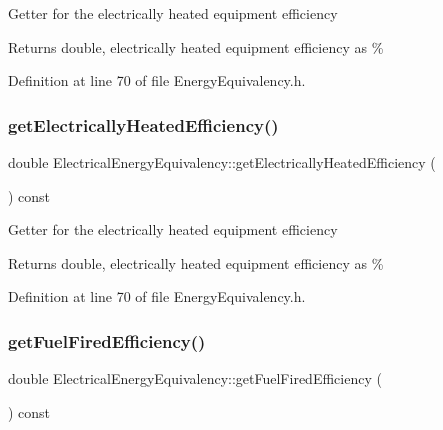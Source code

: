 Getter for the electrically heated equipment efficiency

\begin{DoxyReturn}{Returns}
double, electrically heated equipment efficiency as \% 
\end{DoxyReturn}


Definition at line 70 of file Energy\+Equivalency.\+h.

\mbox{\label{class_electrical_energy_equivalency_a83438510f522aa045f4b1007fca1d2fd}} 
\subsubsection{\texorpdfstring{get\+Electrically\+Heated\+Efficiency()}{getElectricallyHeatedEfficiency()}\hspace{0.1cm}{\footnotesize\ttfamily [3/3]}}
{\footnotesize\ttfamily double Electrical\+Energy\+Equivalency\+::get\+Electrically\+Heated\+Efficiency (\begin{DoxyParamCaption}{ }\end{DoxyParamCaption}) const\hspace{0.3cm}{\ttfamily [inline]}}

Getter for the electrically heated equipment efficiency

\begin{DoxyReturn}{Returns}
double, electrically heated equipment efficiency as \% 
\end{DoxyReturn}


Definition at line 70 of file Energy\+Equivalency.\+h.

\mbox{\label{class_electrical_energy_equivalency_adc8def25354f6ba8c3479040507b0ea6}} 
\subsubsection{\texorpdfstring{get\+Fuel\+Fired\+Efficiency()}{getFuelFiredEfficiency()}\hspace{0.1cm}{\footnotesize\ttfamily [1/3]}}
{\footnotesize\ttfamily double Electrical\+Energy\+Equivalency\+::get\+Fuel\+Fired\+Efficiency (\begin{DoxyParamCaption}{ }\end{DoxyParamCaption}) const\hspace{0.3cm}{\ttfamily [inline]}}

